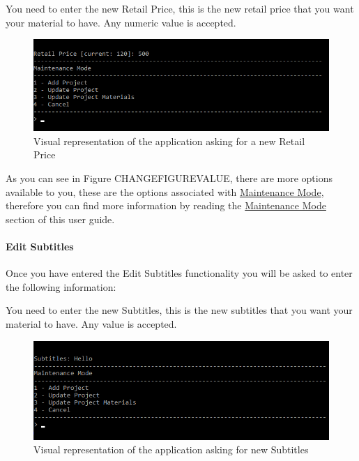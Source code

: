 \documentclass[
  english,
  a4paper,
,tablecaptionabove
]{scrartcl}
\begin{document}
You need to enter the new Retail Price, this is the new retail price
that you want your material to have. Any numeric value is accepted.

\begin{figure}
\centering
\includegraphics{images/user-guide/maintenance-mode/update-project-material-retail-price.png}
\caption{Visual representation of the application asking for a new
Retail Price}
\end{figure}

As you can see in Figure CHANGEFIGUREVALUE, there are more options
available to you, these are the options associated with
\protect\hyperlink{using-maintenance-mode}{Maintenance Mode}, therefore
you can find more information by reading the
\protect\hyperlink{using-maintenance-mode}{Maintenance Mode} section of
this user guide.

\newpage

\hypertarget{edit-subtitles}{%
\paragraph{Edit Subtitles}\label{edit-subtitles}}

Once you have entered the Edit Subtitles functionality you will be asked
to enter the following information:

You need to enter the new Subtitles, this is the new subtitles that you
want your material to have. Any value is accepted.

\begin{figure}
\centering
\includegraphics{images/user-guide/maintenance-mode/update-project-material-subtitles.png}
\caption{Visual representation of the application asking for new
Subtitles}
\end{figure}
\end{document}
